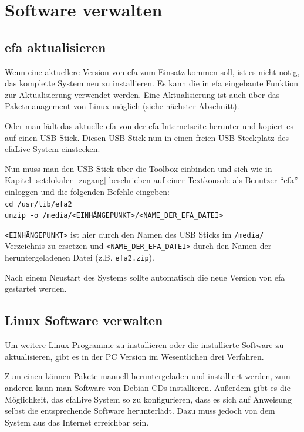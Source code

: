 \documentclass[a4paper,12pt,twoside]{article}
\begin{document}
\section{Software verwalten}
\label{sct:software_verwalten}
\subsection{efa aktualisieren}
\label{update_efa}
Wenn eine aktuellere Version von efa zum Einsatz kommen soll, ist es
nicht nötig, das komplette System neu zu installieren. Es kann die in
efa eingebaute Funktion zur Aktualisierung verwendet werden. Eine 
Aktualisierung ist auch über das Paketmanagement von Linux möglich (siehe
nächster Abschnitt).

Oder man lädt das aktuelle efa von der efa Internetseite \cite{EFA1}
herunter und kopiert es auf einen USB Stick. Diesen USB Stick nun in
einen freien USB Steckplatz des efaLive System einstecken. 

Nun muss man den USB Stick über die Toolbox einbinden und sich wie in
Kapitel \ref{sct:lokaler_zugang} beschrieben auf einer Textkonsole als Benutzer
"`efa"' einloggen und die folgenden Befehle eingeben:
\bigskip
\\
\texttt{cd /usr/lib/efa2\\
unzip -o /media/{\textless}EINHÄNGEPUNKT{\textgreater}/{\textless}NAME\_DER\_EFA\_DATEI{\textgreater}}

\bigskip
\texttt{{\textless}EINHÄNGEPUNKT{\textgreater}} ist hier durch den Namen des USB
Sticks im \texttt{/media/} Verzeichnis zu ersetzen und \texttt{{\textless}NAME\_DER\_EFA\_DATEI{\textgreater}} 
durch den Namen der heruntergeladenen Datei (z.B. \texttt{efa2.zip}).

Nach einem Neustart des Systems sollte automatisch die neue Version von
efa gestartet werden.


\subsection{Linux Software verwalten}
\label{sct:linux_software}
Um weitere Linux Programme zu installieren oder die installierte
Software zu aktualisieren, gibt es in der PC Version im Wesentlichen
drei Verfahren. 

Zum einen können Pakete manuell heruntergeladen und installiert werden,
zum anderen kann man Software von Debian CDs installieren. Außerdem
gibt es die Möglichkeit, das efaLive System so zu konfigurieren, dass
es sich auf Anweisung selbst die entsprechende Software herunterlädt.
Dazu muss jedoch von dem System aus das Internet erreichbar sein.
\end{document}
